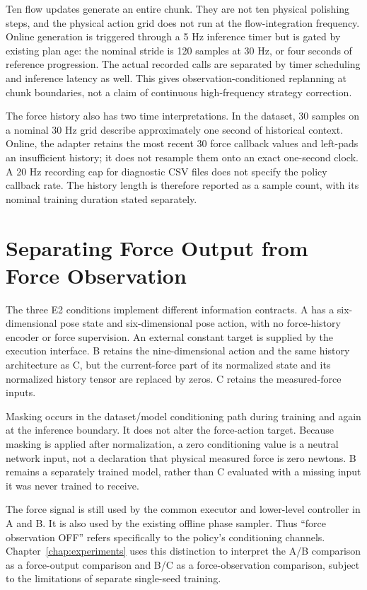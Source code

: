 Ten flow updates generate an entire chunk. They are not ten physical polishing steps, and the physical action grid does not run at the flow-integration frequency. Online generation is triggered through a 5 Hz inference timer but is gated by existing plan age: the nominal stride is 120 samples at 30 Hz, or four seconds of reference progression. The actual recorded calls are separated by timer scheduling and inference latency as well. This gives observation-conditioned replanning at chunk boundaries, not a claim of continuous high-frequency strategy correction.

The force history also has two time interpretations. In the dataset, 30 samples on a nominal 30 Hz grid describe approximately one second of historical context. Online, the adapter retains the most recent 30 force callback values and left-pads an insufficient history; it does not resample them onto an exact one-second clock. A 20 Hz recording cap for diagnostic CSV files does not specify the policy callback rate. The history length is therefore reported as a sample count, with its nominal training duration stated separately.

\section{Separating Force Output from Force Observation}
The three E2 conditions implement different information contracts. A has a six-dimensional pose state and six-dimensional pose action, with no force-history encoder or force supervision. An external constant target is supplied by the execution interface. B retains the nine-dimensional action and the same history architecture as C, but the current-force part of its normalized state and its normalized history tensor are replaced by zeros. C retains the measured-force inputs.

Masking occurs in the dataset/model conditioning path during training and again at the inference boundary. It does not alter the force-action target. Because masking is applied after normalization, a zero conditioning value is a neutral network input, not a declaration that physical measured force is zero newtons. B remains a separately trained model, rather than C evaluated with a missing input it was never trained to receive.

The force signal is still used by the common executor and lower-level controller in A and B. It is also used by the existing offline phase sampler. Thus ``force observation OFF'' refers specifically to the policy's conditioning channels. Chapter~\ref{chap:experiments} uses this distinction to interpret the A/B comparison as a force-output comparison and B/C as a force-observation comparison, subject to the limitations of separate single-seed training.

